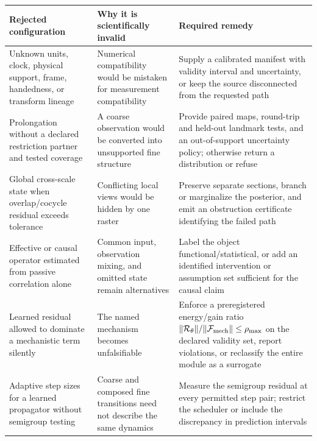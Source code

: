 \begin{table}[t]
\centering
\footnotesize
\setlength{\tabcolsep}{4pt}
\renewcommand{\arraystretch}{1.09}
\begin{tabularx}{\textwidth}{@{}p{}p{}X@{}}
\toprule
\textbf{Rejected configuration} & \textbf{Why it is scientifically invalid} &
\textbf{Required remedy}\\
\midrule
Unknown units, clock, physical support, frame, handedness, or transform lineage &
Numerical compatibility would be mistaken for measurement compatibility &
Supply a calibrated manifest with validity interval and uncertainty, or keep
the source disconnected from the requested path\\

Prolongation without a declared restriction partner and tested coverage &
A coarse observation would be converted into unsupported fine structure &
Provide paired maps, round-trip and held-out landmark tests, and an
out-of-support uncertainty policy; otherwise return a distribution or refuse\\

Global cross-scale state when overlap/cocycle residual exceeds tolerance &
Conflicting local views would be hidden by one raster &
Preserve separate sections, branch or marginalize the posterior, and emit an
obstruction certificate identifying the failed path\\

Effective or causal operator estimated from passive correlation alone &
Common input, observation mixing, and omitted state remain alternatives &
Label the object functional/statistical, or add an identified intervention or
assumption set sufficient for the causal claim\\

Learned residual allowed to dominate a mechanistic term silently &
The named mechanism becomes unfalsifiable &
Enforce a preregistered energy/gain ratio
\(\|\mathcal R_\theta\|/\|\mathcal F_{\rm mech}\|\leq\rho_{\max}\) on the
declared validity set, report violations, or reclassify the entire module as a
surrogate\\

Adaptive step sizes for a learned propagator without semigroup testing &
Coarse and composed fine transitions need not describe the same dynamics &
Measure the semigroup residual at every permitted step pair; restrict the
scheduler or include the discrepancy in prediction intervals\\


\end{tabularx}
\end{table}
